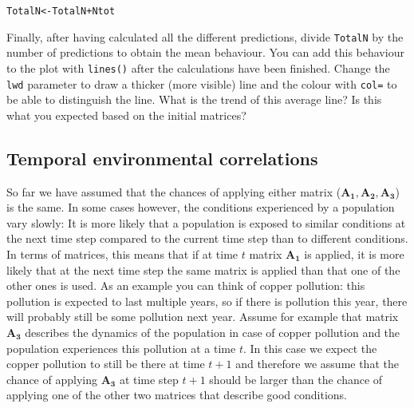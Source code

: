 \documentclass{article}\usepackage[]{graphicx}\usepackage[]{color}
\makeatletter
\newcommand{\hlopt}[1]{\textcolor[rgb]{0,0,0}{#1}}%
\newcommand{\hlstd}[1]{\textcolor[rgb]{0.345,0.345,0.345}{#1}}%
\newcommand{\hlkwb}[1]{\textcolor[rgb]{0.69,0.353,0.396}{#1}}%
\newenvironment{kframe}{%
 \def\at@end@of@kframe{}%
 \ifinner\ifhmode%
  \def\at@end@of@kframe{\end{minipage}}%
  \begin{minipage}{\columnwidth}%
 \fi\fi%
 \def\FrameCommand##1{\hskip\@totalleftmargin \hskip-\fboxsep
 \colorbox{shadecolor}{##1}\hskip-\fboxsep
     \hskip-\linewidth \hskip-\@totalleftmargin \hskip\columnwidth}%
 \MakeFramed {\advance\hsize-\width
   \@totalleftmargin\z@ \linewidth\hsize
   \@setminipage}}%
 {\par\unskip\endMakeFramed%
 \at@end@of@kframe}
\newenvironment{knitrout}{}{} %
\makeatother
\begin{document}
\begin{knitrout}
\color{fgcolor}\begin{kframe}
\begin{alltt}
\hlstd{TotalN}\hlkwb{<-}\hlstd{TotalN}\hlopt{+}\hlstd{Ntot}
\end{alltt}
\end{kframe}
\end{knitrout}
Finally, after having calculated all the different predictions, divide \texttt{TotalN} by the number of predictions to obtain the mean behaviour. You can add this behaviour to the plot with \texttt{lines()} after the calculations have been finished. Change the \texttt{lwd} parameter to draw a thicker (more visible) line and the colour with \texttt{col=} to be able to distinguish the line. What is the trend of this average line? Is this what you expected based on the initial matrices? 





\subsection{Temporal environmental correlations}
So far we have assumed that the chances of applying either matrix ($\boldsymbol{A_1,A_2,A_3}$) is the same. In some cases however, the conditions experienced by a population vary slowly: It is more likely that a population is exposed to similar conditions at the next time step compared to the current time step than to different conditions. In terms of matrices, this means that if at time $t$ matrix $\boldsymbol{A_1}$ is applied, it is more likely that at the next time step the same matrix is applied than that one of the other ones is used. As an example you can think of copper pollution: this pollution is expected to last multiple years, so if there is pollution this year, there will probably still be some pollution next year. Assume for example that matrix $\boldsymbol{A_3}$ describes the dynamics of the population in case of copper pollution and the population experiences this pollution at a time $t$. In this case we expect the copper pollution to still be there at time $t+1$ and therefore we assume that the chance of applying $\boldsymbol{A_3}$ at time step $t+1$ should be larger than the chance of applying one of the other two matrices that describe good conditions.
\end{document}
